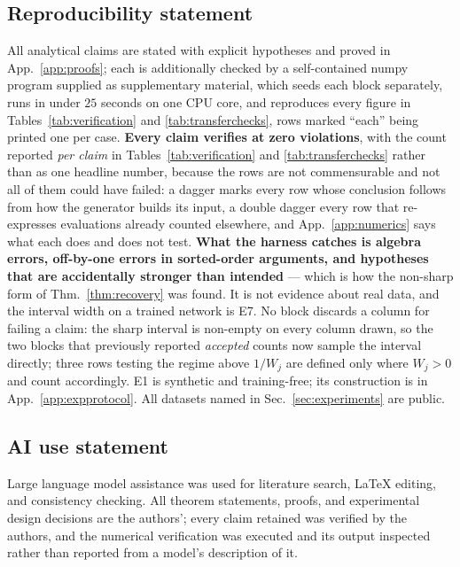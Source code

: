 \documentclass{article}
\begin{document}
\subsection*{Reproducibility statement}
All analytical claims are stated with explicit hypotheses and proved in App.~\ref{app:proofs};
each is additionally checked by a self-contained numpy program supplied as supplementary
material, which seeds each block separately, runs in under $25$ seconds on one CPU core, and
reproduces every figure in Tables~\ref{tab:verification} and \ref{tab:transferchecks}, rows
marked ``each'' being printed one per case.
\textbf{Every claim verifies at zero violations}, with the count reported \emph{per claim} in
Tables~\ref{tab:verification} and \ref{tab:transferchecks} rather than as one headline number,
because the rows are not commensurable and not all of them could have failed: a dagger marks
every row whose conclusion follows from how the generator builds its input, a double dagger every
row that re-expresses evaluations already counted elsewhere, and App.~\ref{app:numerics} says
what each does and does not test. \textbf{What the harness catches is algebra errors, off-by-one
errors in sorted-order arguments, and hypotheses that are accidentally stronger than intended} ---
which is how the non-sharp form of Thm.~\ref{thm:recovery} was found. It is not evidence about
real data, and the interval width on a trained network is E7. No block discards a column for
failing a claim: the sharp interval is non-empty on every column drawn, so the two blocks that
previously reported \emph{accepted} counts now sample the interval directly; three rows testing
the regime above $1/W_j$ are defined only where $W_j>0$ and count accordingly. E1 is synthetic and
training-free; its construction is in App.~\ref{app:expprotocol}. All datasets named in
Sec.~\ref{sec:experiments} are public.

\subsection*{AI use statement}
Large language model assistance was used for literature search, LaTeX editing, and consistency
checking. All theorem statements, proofs, and experimental design decisions are the authors';
every claim retained was verified by the authors, and the numerical verification was executed and
its output inspected rather than reported from a model's description of it.



\end{document}
